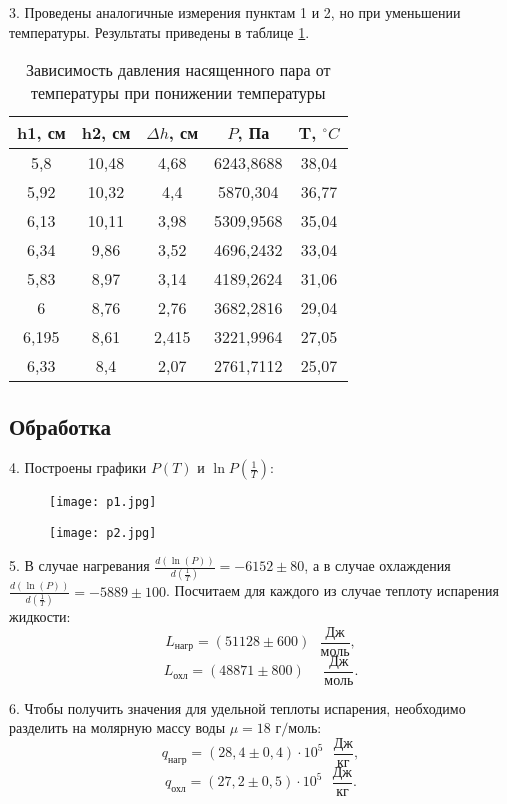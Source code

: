 3. Проведены аналогичные измерения пунктам 1 и 2, но при уменьшении температуры. Результаты приведены в таблице \ref*{table:vniz}.
\begin{table}[ht]
    \centering
    \begin{tabular}{|c|c|c|c|c|}
        \hline
        h1, см & h2, см & $\Delta h$, см & $P$, Па & T, $\text{}^\circ C$\\
        \hline
		5,8 & 10,48 & 4,68 & 6243,8688 & 38,04 \\
		\hline
		5,92 & 10,32 & 4,4 & 5870,304 & 36,77 \\
		\hline
		6,13 & 10,11 & 3,98 & 5309,9568 & 35,04 \\
		\hline
		6,34 & 9,86 & 3,52 & 4696,2432 & 33,04 \\
		\hline
		5,83 & 8,97 & 3,14 & 4189,2624 & 31,06 \\
		\hline
		6 & 8,76 & 2,76 & 3682,2816 & 29,04 \\
		\hline
		6,195 & 8,61 & 2,415 & 3221,9964 & 27,05 \\
		\hline
		6,33 & 8,4 & 2,07 & 2761,7112 & 25,07 \\
		\hline
    \end{tabular}
    \caption{Зависимость давления насященного пара от температуры при понижении температуры}
    \label{table:vniz}
\end{table}

\subsection{Обработка}

4. Построены графики $P(T)$ и $\ln{P}(\frac 1 T)$:

\begin{minipage}{\linewidth}
	\centering
	\begin{minipage}{0.45\linewidth}
		\begin{figure}[H]
			\texttt{[image: p1.jpg]}
		\end{figure}
	\end{minipage}
	\hspace{0\linewidth}
	\begin{minipage}{0.45\linewidth}
		\begin{figure}[H]
			\texttt{[image: p2.jpg]}
		\end{figure}
	\end{minipage}
\end{minipage}


5. В случае нагревания $\frac{d\left(\ln(P)\right)}{d\left(\frac 1 T\right)} = -6152 \pm 80$, а в случае охлаждения $\frac{d\left(\ln(P)\right)}{d\left(\frac 1 T\right)} = -5889 \pm 100$.
Посчитаем для каждого из случае теплоту испарения жидкости:
\[L_\text{нагр} = (51128 \pm 600) \text{ } \frac{\text{Дж}}{\text{моль}},\]
\[L_\text{охл} = (48871 \pm 800) \text{ }\text{ } \frac{\text{Дж}}{\text{моль}}.\]

6. Чтобы получить значения для удельной теплоты испарения, необходимо разделить на молярную массу воды $\mu = 18 \text{ г} / \text{моль}$:
\[q_\text{нагр} = (28,4 \pm 0,4) \cdot 10^5 \text{ } \frac{\text{Дж}}{\text{кг}},\]
\[q_\text{охл} = (27,2 \pm 0,5) \cdot 10^5 \text{ } \frac{\text{Дж}}{\text{кг}}.\]
